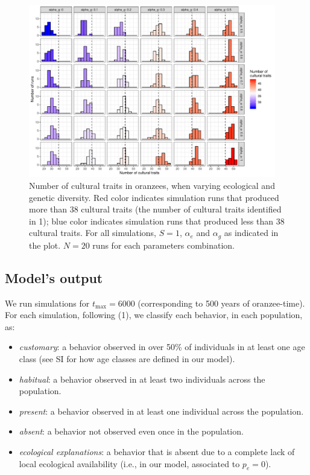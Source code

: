 \documentclass[9pt,twocolumn,twoside,]{pnas-new}
\begin{document}
\begin{figure}[h!]
\begin{center}
\includegraphics[width=10.8cm]{figures/figure_1.pdf}
\caption{Number of cultural traits in oranzees, when varying ecological and genetic diversity. Red color indicates simulation runs that produced more than 38 cultural traits (the number of cultural traits identified in 1); blue color indicates simulation runs that produced less than 38 cultural traits. For all simulations, $S=1$, $\alpha_e$ and $\alpha_g$ as indicated in the plot. $N=20$ runs for each parameters combination.}
\label{Figure1}
\end{center}
\end{figure}

\hypertarget{format}{%
\subsection*{Model's output}\label{format}}

We run simulations for \(t_\text{max}=6000\) (corresponding to 500 years
of oranzee-time). For each simulation, following (1), we classify each
behavior, in each population, as:

\begin{itemize}
\item
  \emph{customary}: a behavior observed in over 50\% of individuals in
  at least one age class (see SI for how age classes are defined in our
  model).
\item
  \emph{habitual}: a behavior observed in at least two individuals
  across the population.
\item
  \emph{present}: a behavior observed in at least one individual across
  the population.
\item
  \emph{absent}: a behavior not observed even once in the population.
\item
  \emph{ecological explanations}: a behavior that is absent due to a
  complete lack of local ecological availability (i.e., in our model,
  associated to \(p_e=0\)).
\end{itemize}
\end{document}
